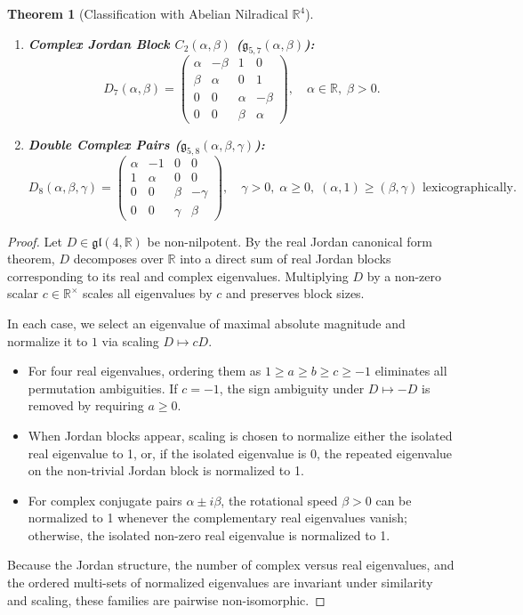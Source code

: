 \documentclass[11pt,a4paper]{article}
\newtheorem{theorem}{Theorem}[section]
\theoremstyle{definition}
\theoremstyle{remark}
\newcommand{\R}{\mathbb{R}}
\newcommand{\g}{\mathfrak{g}}
\begin{document}
\begin{theorem}[Classification with Abelian Nilradical $\R^4$]
\begin{enumerate}
    \item \textbf{Complex Jordan Block $C_2(\alpha, \beta)$ ($\g_{5,7}(\alpha, \beta)$):}
    \begin{equation}
        D_7(\alpha, \beta) = \begin{pmatrix} \alpha & -\beta & 1 & 0 \\ \beta & \alpha & 0 & 1 \\ 0 & 0 & \alpha & -\beta \\ 0 & 0 & \beta & \alpha \end{pmatrix}, \quad \alpha \in \R, \; \beta > 0.
    \end{equation}
    
    \item \textbf{Double Complex Pairs ($\g_{5,8}(\alpha, \beta, \gamma)$):}
    \begin{equation}
        D_8(\alpha, \beta, \gamma) = \begin{pmatrix} \alpha & -1 & 0 & 0 \\ 1 & \alpha & 0 & 0 \\ 0 & 0 & \beta & -\gamma \\ 0 & 0 & \gamma & \beta \end{pmatrix}, \quad \gamma > 0, \; \alpha \ge 0, \; (\alpha, 1) \ge (\beta, \gamma) \text{ lexicographically}.
    \end{equation}
\end{enumerate}
\end{theorem}

\begin{proof}
Let $D \in \mathfrak{gl}(4, \R)$ be non-nilpotent. By the real Jordan canonical form theorem, $D$ decomposes over $\R$ into a direct sum of real Jordan blocks corresponding to its real and complex eigenvalues. Multiplying $D$ by a non-zero scalar $c \in \R^\times$ scales all eigenvalues by $c$ and preserves block sizes.

In each case, we select an eigenvalue of maximal absolute magnitude and normalize it to $1$ via scaling $D \mapsto c D$. 
\begin{itemize}
    \item For four real eigenvalues, ordering them as $1 \ge a \ge b \ge c \ge -1$ eliminates all permutation ambiguities. If $c = -1$, the sign ambiguity under $D \mapsto -D$ is removed by requiring $a \ge 0$.
    \item When Jordan blocks appear, scaling is chosen to normalize either the isolated real eigenvalue to 1, or, if the isolated eigenvalue is 0, the repeated eigenvalue on the non-trivial Jordan block is normalized to 1.
    \item For complex conjugate pairs $\alpha \pm i\beta$, the rotational speed $\beta > 0$ can be normalized to 1 whenever the complementary real eigenvalues vanish; otherwise, the isolated non-zero real eigenvalue is normalized to 1.
\end{itemize}
Because the Jordan structure, the number of complex versus real eigenvalues, and the ordered multi-sets of normalized eigenvalues are invariant under similarity and scaling, these families are pairwise non-isomorphic.
\end{proof}
\end{document}
